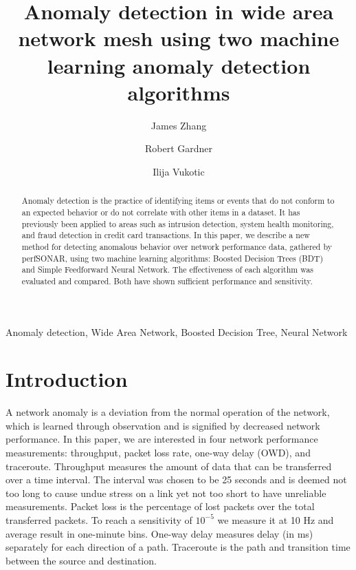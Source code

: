 \documentclass[5p]{elsarticle}
\begin{document}
\begin{frontmatter}

\title{Anomaly detection in wide area network mesh using two machine learning anomaly detection algorithms}

\author{James Zhang}
\author{Robert Gardner}
\author{Ilija Vukotic}
\address{University of Chicago, PRC 933 E56$^{th}$ St., Chicago, USA}



\begin{abstract}
Anomaly detection is the practice of identifying items or events that do not conform to an expected behavior or do not correlate with other items in a dataset. It has previously been applied to areas such as intrusion detection, system health monitoring, and fraud detection in credit card transactions. In this paper, we describe a new method for detecting anomalous behavior over network performance data, gathered by perfSONAR, using two machine learning algorithms: Boosted Decision Trees (BDT) and Simple Feedforward Neural Network. The effectiveness of each algorithm was evaluated and compared. Both have shown sufficient performance and sensitivity.
\end{abstract}

\begin{keyword}
Anomaly detection, Wide Area Network, Boosted Decision Tree, Neural Network
\end{keyword}

\end{frontmatter}



\section{Introduction}

A network anomaly is a deviation from the normal operation of the network, which is learned through observation and is signified by decreased network performance.  In this paper, we are interested in four network performance measurements: throughput, packet loss rate, one-way delay (OWD), and traceroute. Throughput measures the amount of data that can be transferred over a time interval. The interval was chosen to be 25 seconds and is deemed not too long to cause undue stress on a link yet not too short to have unreliable measurements. Packet loss is the percentage of lost packets over the total transferred packets. To reach a sensitivity of $10^{-5}$ we measure it at 10 Hz and average result in one-minute bins. One-way delay measures delay (in ms) separately for each direction of a path. Traceroute is the path and transition time between the source and destination.
\end{document}

